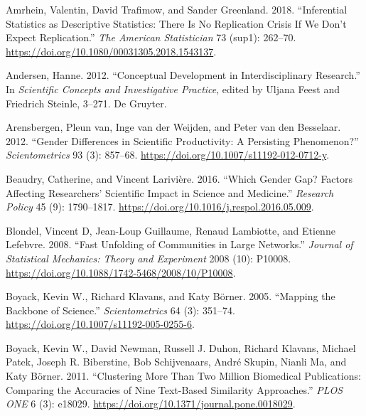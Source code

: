 \documentclass[
  11pt,
]{article}
\newlength{\cslhangindent}
\newenvironment{CSLReferences}[2] %
 {%
  \setlength{\parindent}{0pt}
  \ifodd #1 \everypar{\setlength{\hangindent}{\cslhangindent}}\ignorespaces\fi
  \ifnum #2 > 0
  \setlength{\parskip}{#2\baselineskip}
  \fi
 }%
 {}
\begin{document}
\hypertarget{refs}{}
\begin{CSLReferences}{1}{0}
\leavevmode{}%
Amrhein, Valentin, David Trafimow, and Sander Greenland. 2018. {``Inferential Statistics as Descriptive Statistics: There Is No Replication Crisis If We Don't Expect Replication.''} \emph{The American Statistician} 73 (sup1): 262--70. \url{https://doi.org/10.1080/00031305.2018.1543137}.

\leavevmode{}%
Andersen, Hanne. 2012. {``Conceptual Development in Interdisciplinary Research.''} In \emph{Scientific Concepts and Investigative Practice}, edited by Uljana Feest and Friedrich Steinle, 3--271. De Gruyter.

\leavevmode{}%
Arensbergen, Pleun van, Inge van der Weijden, and Peter van den Besselaar. 2012. {``Gender Differences in Scientific Productivity: A Persisting Phenomenon?''} \emph{Scientometrics} 93 (3): 857--68. \url{https://doi.org/10.1007/s11192-012-0712-y}.

\leavevmode{}%
Beaudry, Catherine, and Vincent Larivière. 2016. {``Which Gender Gap? Factors Affecting Researchers' Scientific Impact in Science and Medicine.''} \emph{Research Policy} 45 (9): 1790--1817. \url{https://doi.org/10.1016/j.respol.2016.05.009}.

\leavevmode{}%
Blondel, Vincent D, Jean-Loup Guillaume, Renaud Lambiotte, and Etienne Lefebvre. 2008. {``Fast Unfolding of Communities in Large Networks.''} \emph{Journal of Statistical Mechanics: Theory and Experiment} 2008 (10): P10008. \url{https://doi.org/10.1088/1742-5468/2008/10/P10008}.

\leavevmode{}%
Boyack, Kevin W., Richard Klavans, and Katy Börner. 2005. {``Mapping the Backbone of Science.''} \emph{Scientometrics} 64 (3): 351--74. \url{https://doi.org/10.1007/s11192-005-0255-6}.

\leavevmode{}%
Boyack, Kevin W., David Newman, Russell J. Duhon, Richard Klavans, Michael Patek, Joseph R. Biberstine, Bob Schijvenaars, André Skupin, Nianli Ma, and Katy Börner. 2011. {``Clustering More Than Two Million Biomedical Publications: Comparing the Accuracies of Nine Text-Based Similarity Approaches.''} \emph{PLOS ONE} 6 (3): e18029. \url{https://doi.org/10.1371/journal.pone.0018029}.


\end{CSLReferences}
\end{document}
